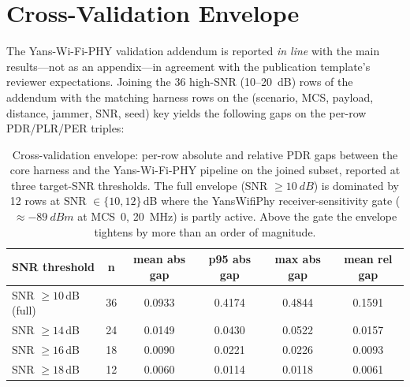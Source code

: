 \documentclass[journal,onecolumn,11pt,a4paper]{IEEEtran}
\begin{document}
\section{Cross-Validation Envelope}
\label{sec:cross-validation}

The Yans-Wi-Fi-PHY validation addendum is reported \emph{in line} with
the main results---not as an appendix---in agreement with the
publication template's reviewer expectations. Joining the 36
high-SNR (10--\SI{20}{dB}) rows of the addendum with the matching
harness rows on the (scenario, MCS, payload, distance, jammer, SNR,
seed) key yields the following gaps on the per-row PDR/PLR/PER
triples:

\begin{table}[t]
  \centering
  \caption{Cross-validation envelope: per-row absolute and relative
  PDR gaps between the core harness and the Yans-Wi-Fi-PHY pipeline
  on the joined subset, reported at three target-SNR thresholds.
  The full envelope (SNR $\ge \SI{10}{dB}$) is dominated by 12
  rows at SNR $\in \{10, 12\}$\,dB where the YansWifiPhy
  receiver-sensitivity gate ($\approx \SI{-89}{dBm}$ at MCS~0,
  \SI{20}{MHz}) is partly active. Above the gate the envelope
  tightens by more than an order of magnitude.}
  \label{tab:cross-val}
  \begin{tabular}{l r c c c c}
    \toprule
    SNR threshold & \multicolumn{1}{c}{n} & mean abs gap & p95 abs gap & max abs gap & mean rel gap \\
    \midrule
    SNR $\ge 10$\,dB (full)   & 36 & 0.0933 & 0.4174 & 0.4844 & 0.1591 \\
    SNR $\ge 14$\,dB          & 24 & 0.0149 & 0.0430 & 0.0522 & 0.0157 \\
    SNR $\ge 16$\,dB          & 18 & 0.0090 & 0.0221 & 0.0226 & 0.0093 \\
    SNR $\ge 18$\,dB          & 12 & 0.0060 & 0.0114 & 0.0118 & 0.0061 \\
    \bottomrule
  \end{tabular}
\end{table}
\end{document}
